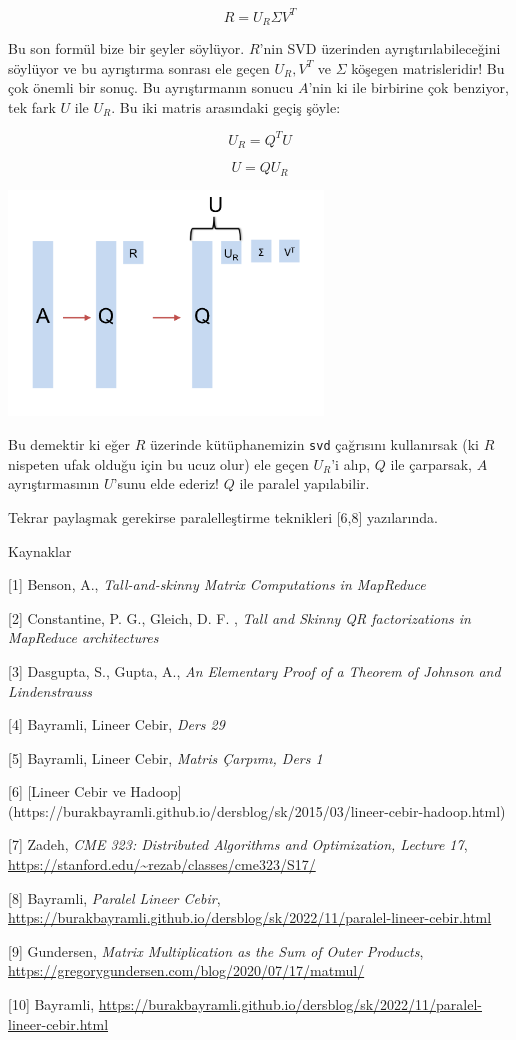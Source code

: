 \documentclass[12pt,fleqn]{article}\usepackage{../../common}
\begin{document}
$$ R = U_R \Sigma V^T $$

Bu son formül bize bir şeyler söylüyor. $R$'nin SVD üzerinden
ayrıştırılabileceğini söylüyor ve bu ayrıştırma sonrası ele geçen $U_R,V^T$ ve
$\Sigma$ köşegen matrisleridir! Bu çok önemli bir sonuç.  Bu ayrıştırmanın
sonucu $A$'nin ki ile birbirine çok benziyor, tek fark $U$ ile $U_R$. Bu iki
matris arasındaki geçiş şöyle:

$$ U_R = Q^T U $$ 

$$ U = QU_R $$ 

\includegraphics[height=6cm]{ur.png}

Bu demektir ki eğer $R$ üzerinde kütüphanemizin \verb!svd!  çağrısını
kullanırsak (ki $R$ nispeten ufak olduğu için bu ucuz olur) ele geçen $U_R$'i
alıp, $Q$ ile çarparsak, $A$ ayrıştırmasının $U$'sunu elde ederiz! $Q$ ile
paralel yapılabilir.

Tekrar paylaşmak gerekirse paralelleştirme teknikleri [6,8] yazılarında.

Kaynaklar

[1] Benson, A., {\em Tall-and-skinny Matrix Computations in MapReduce}

[2] Constantine, P. G., Gleich, D. F. , {\em Tall and Skinny QR factorizations in MapReduce architectures}

[3] Dasgupta, S., Gupta, A., {\em An Elementary Proof of a Theorem of Johnson and Lindenstrauss}

[4] Bayramli, Lineer Cebir, {\em Ders 29}

[5] Bayramli, Lineer Cebir, {\em Matris Çarpımı, Ders 1}

[6] [Lineer Cebir ve Hadoop](https://burakbayramli.github.io/dersblog/sk/2015/03/lineer-cebir-hadoop.html)

[7] Zadeh, {\em CME 323: Distributed Algorithms and Optimization, Lecture 17},
    \url{https://stanford.edu/~rezab/classes/cme323/S17/}

[8] Bayramli, {\em Paralel Lineer Cebir},
    \url{https://burakbayramli.github.io/dersblog/sk/2022/11/paralel-lineer-cebir.html}

[9] Gundersen, {\em Matrix Multiplication as the Sum of Outer Products},
    \url{https://gregorygundersen.com/blog/2020/07/17/matmul/}

[10] Bayramli, \url{https://burakbayramli.github.io/dersblog/sk/2022/11/paralel-lineer-cebir.html}
\end{document}
